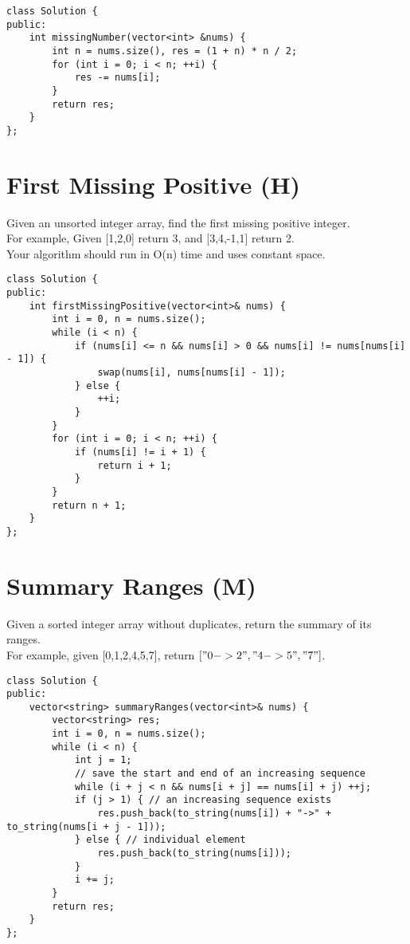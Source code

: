\begin{lstlisting}
class Solution {
public:
    int missingNumber(vector<int> &nums) {
        int n = nums.size(), res = (1 + n) * n / 2;
        for (int i = 0; i < n; ++i) {
            res -= nums[i];
        }
        return res;
    }
};
\end{lstlisting}


\section{First Missing Positive (H)}
Given an unsorted integer array, find the first missing positive integer.\\

For example,
Given [1,2,0] return 3,
and [3,4,-1,1] return 2.\\

Your algorithm should run in O(n) time and uses constant space. \\

\begin{lstlisting}
class Solution {
public:
    int firstMissingPositive(vector<int>& nums) {
        int i = 0, n = nums.size();
        while (i < n) {
            if (nums[i] <= n && nums[i] > 0 && nums[i] != nums[nums[i] - 1]) {
                swap(nums[i], nums[nums[i] - 1]);
            } else {
                ++i;
            }
        }
        for (int i = 0; i < n; ++i) {
            if (nums[i] != i + 1) {
                return i + 1;
            }
        }
        return n + 1;
    }
};
\end{lstlisting}


\section{Summary Ranges (M)}
Given a sorted integer array without duplicates, return the summary of its ranges.\\

For example, given [0,1,2,4,5,7], return $["0->2","4->5","7"]$.\\

\begin{lstlisting}
class Solution {
public:
    vector<string> summaryRanges(vector<int>& nums) {
        vector<string> res;
        int i = 0, n = nums.size();
        while (i < n) {
            int j = 1;
            // save the start and end of an increasing sequence
            while (i + j < n && nums[i + j] == nums[i] + j) ++j;
            if (j > 1) { // an increasing sequence exists
                res.push_back(to_string(nums[i]) + "->" + to_string(nums[i + j - 1]));
            } else { // individual element
                res.push_back(to_string(nums[i]));
            }
            i += j;
        }
        return res;
    }
};
\end{lstlisting}


